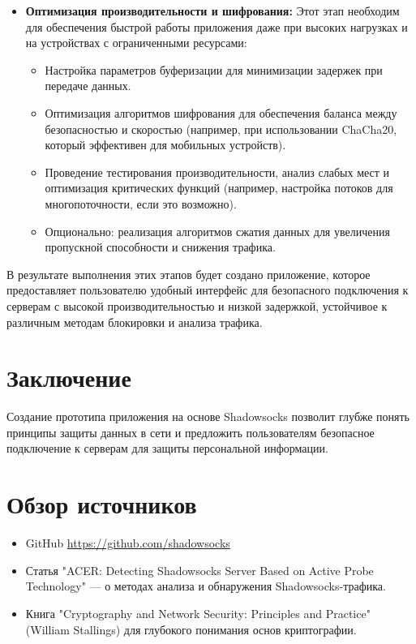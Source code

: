 \documentclass{SCWorks}
\begin{document}
\begin{itemize}
    \item \textbf{Оптимизация производительности и шифрования:}  
    Этот этап необходим для обеспечения быстрой работы приложения даже при высоких нагрузках и на устройствах с ограниченными ресурсами:
    \begin{itemize}
        \item Настройка параметров буферизации для минимизации задержек при передаче данных.
        \item Оптимизация алгоритмов шифрования для обеспечения баланса между безопасностью и скоростью (например, при использовании ChaCha20, который эффективен для мобильных устройств).
        \item Проведение тестирования производительности, анализ слабых мест и оптимизация критических функций (например, настройка потоков для многопоточности, если это возможно).
        \item Опционально: реализация алгоритмов сжатия данных для увеличения пропускной способности и снижения трафика.
    \end{itemize}
\end{itemize}

В результате выполнения этих этапов будет создано приложение, которое предоставляет пользователю удобный интерфейс для безопасного подключения к серверам с высокой производительностью и низкой задержкой, устойчивое к различным методам блокировки и анализа трафика.


\section*{Заключение}

Создание прототипа приложения на основе Shadowsocks позволит глубже понять принципы защиты данных в сети и предложить пользователям безопасное подключение к серверам для защиты персональной информации.

\newpage

\section*{Обзор источников}

\begin{itemize}
    \item GitHub \url{https://github.com/shadowsocks}
    \item Статья "ACER: Detecting Shadowsocks Server Based on Active Probe Technology" --- о методах анализа и обнаружения Shadowsocks-трафика.
    \item Книга "Cryptography and Network Security: Principles and Practice" (William Stallings) для глубокого понимания основ криптографии.
\end{itemize}
\end{document}
